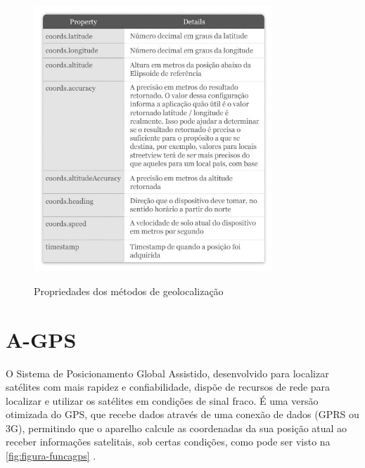 \begin{figure}[H]
    \centering
    \caption{Propriedades dos métodos de geolocalização}
    \includegraphics[width=0.8\textwidth]{./dados/figuras/fig1}
    \label{fig:figura-propertycoords}
\end{figure}

\section{A-GPS}
O Sistema de Posicionamento Global Assistido, desenvolvido para localizar satélites com mais rapidez e confiabilidade, dispõe de recursos de rede para localizar e utilizar os satélites em condições de sinal fraco. É uma versão otimizada do  GPS, que recebe dados através de uma conexão de dados (GPRS ou 3G), permitindo que o aparelho calcule as coordenadas da sua posição atual ao receber informações satelitais, sob certas condições, como pode ser visto na \autoref{fig:figura-funcagps} \cite{oficinanetagps:2018}. 

